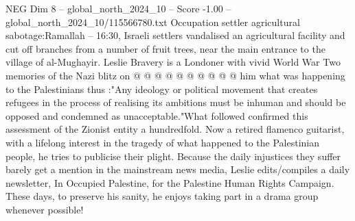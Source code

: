 \begin{textsample}{NEG Dim 8 – global\_north\_2024\_10 – Score -1.00 – global\_north\_2024\_10/115566780.txt}
Occupation settler agricultural sabotage:Ramallah -- 16:30, Israeli settlers vandalised an agricultural facility and cut off branches from a number of fruit trees, near the main entrance to the village of al-Mughayir.
Leslie Bravery is a Londoner with vivid World War Two memories of the Nazi blitz on @ @ @ @ @ @ @ @ @ @ him what was happening to the Palestinians thus :"Any ideology or political movement that creates refugees in the process of realising its ambitions must be inhuman and should be opposed and condemned as unacceptable."What followed confirmed this assessment of the Zionist entity a hundredfold.
Now a retired flamenco guitarist, with a lifelong interest in the tragedy of what happened to the Palestinian people, he tries to publicise their plight.
Because the daily injustices they suffer barely get a mention in the mainstream news media, Leslie edits/compiles a daily newsletter, In Occupied Palestine, for the Palestine Human Rights Campaign.
These days, to preserve his sanity, he enjoys taking part in a drama group whenever possible!

\end{textsample}
